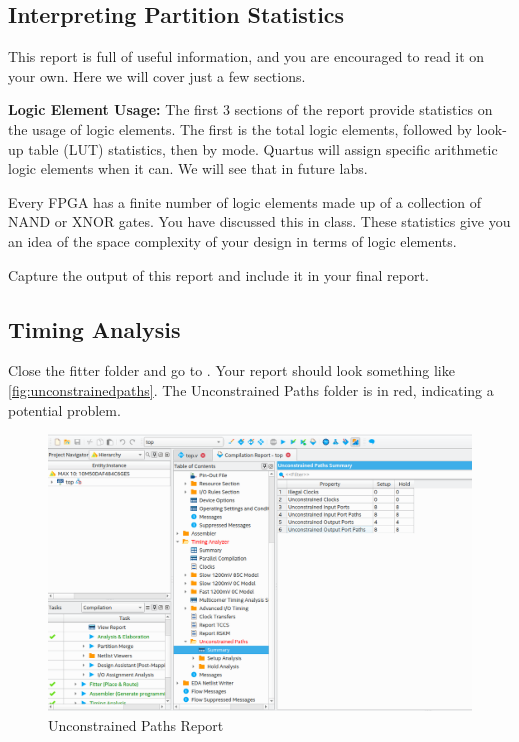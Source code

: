 \documentclass[12pt]{betterjournal}
\begin{document}
\subsection{Interpreting Partition Statistics}
This report is full of useful information, and you are encouraged to read it on your own. Here we will cover just a few sections.

\textbf{Logic Element Usage:} The first 3 sections of the report provide statistics on the usage of logic elements. The first is the total logic elements, followed by look-up table (LUT) statistics, then by mode. Quartus will assign specific arithmetic logic elements when it can. We will see that in future labs.

Every FPGA has a finite number of logic elements made up of a collection of NAND or XNOR gates. You have discussed this in class. These statistics give you an idea of the space complexity of your design in terms of logic elements.

\begin{question}
    Capture the output of this report and include it in your final report.
\end{question}

\subsection{Timing Analysis}
Close the fitter folder and go to . Your report should look something like \autoref{fig:unconstrainedpaths}. The Unconstrained Paths folder is in red, indicating a potential problem. 
\begin{figure}
    \centering
    \includegraphics[width=\linewidth]{unconstrainedpaths.png}
    \caption{Unconstrained Paths Report}
    \label{fig:unconstrainedpaths}
\end{figure}
\end{document}
